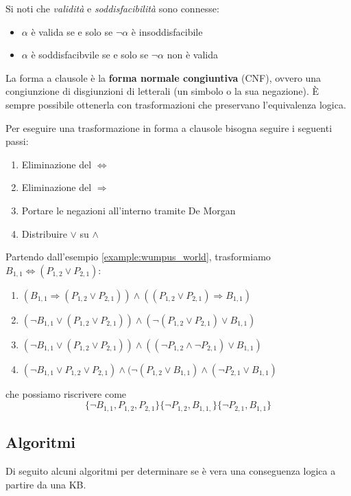 Si noti che \textit{validità} e \textit{soddisfacibilità} sono connesse:
\begin{itemize}
	\item $\alpha$ è valida se e solo se $\neg\alpha$ è insoddisfacibile
	\item $\alpha$ è soddisfacibvile se e solo se $\neg\alpha$ non è valida
\end{itemize}
\begin{definition}
	La forma a clausole è la \textbf{forma normale congiuntiva} (CNF), ovvero una congiunzione di disgiunzioni di letterali (un simbolo o la sua negazione). È sempre possibile ottenerla con trasformazioni che preservano l'equivalenza logica.
\end{definition}
Per eseguire una trasformazione in forma a clausole bisogna seguire i seguenti passi:
\begin{enumerate}
	\item Eliminazione del $\Leftrightarrow$
	\item Eliminazione del $\Rightarrow$
	\item Portare le negazioni all'interno tramite De Morgan
	\item Distribuire $\lor$ su $\land$
\end{enumerate}

\begin{example}
	Partendo dall'esempio \ref{example:wumpus_world}, trasformiamo $B_{1,1} \Leftrightarrow (P_{1,2}\lor P_{2,1})$:
	\begin{enumerate}
		\item $(B_{1,1} \Rightarrow (P_{1,2} \lor P_{2,1})) \land ((P_{1,2} \lor P_{2,1}) \Rightarrow B_{1,1})$
		\item $(\neg B_{1,1} \lor (P_{1,2} \lor P_{2,1})) \land (\neg(P_{1,2} \lor P_{2,1}) \lor B_{1,1})$
		\item $(\neg B_{1,1} \lor (P_{1,2} \lor P_{2,1})) \land ((\neg P_{1,2} \land \neg P_{2,1}) \lor B_{1,1})$
		\item $(\neg B_{1,1} \lor P_{1,2} \lor P_{2,1}) \land (\neg(P_{1,2} \lor B_{1,1}) \land (\neg P_{2,1} \lor B_{1,1})$
	\end{enumerate}
	che possiamo riscrivere come
	\begin{equation*}
		\{\neg B_{1,1}, P_{1,2}, P_{2,1}\}\{\neg P_{1,2}, B_{1,1,}\}\{\neg P_{2,1}, B_{1,1}\}
	\end{equation*}
\end{example}

\newpage
\subsection{Algoritmi}
Di seguito alcuni algoritmi per determinare se è vera una conseguenza logica a partire da una KB.
